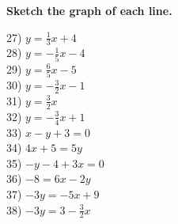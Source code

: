 \documentclass[12pt]{book}
\theoremstyle{definition}
\begin{document}
{\bf Sketch the graph of each line.}
\label{lineargraphs2}
\begin{multicols}{3}
  27) $y = \frac{1}{3} x + 4$\\
  28) $y = - \frac{1}{5} x - 4$\\
  29) $y = \frac{6}{5} x - 5$\\
  30) $y = - \frac{3}{2} x - 1$\\
  31) $y = \frac{3}{2} x$\\
  32) $y = - \frac{3}{4} x + 1$\\
  33) $x - y + 3 = 0$\\
  34) $4 x + 5 = 5 y$\\
  35) $- y - 4 + 3 x = 0$\\
  36) $- 8 = 6 x - 2 y$\\
  37) $- 3 y = - 5 x + 9$\\
  38) $- 3 y = 3 - \frac{3}{2} x$
\end{multicols}
\end{document}
